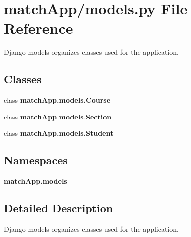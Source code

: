 \section{match\+App/models.py File Reference}
\label{models_8py}


Django models organizes classes used for the application.  


\subsection*{Classes}
\begin{DoxyCompactItemize}
\item 
class {\bf match\+App.\+models.\+Course}
\item 
class {\bf match\+App.\+models.\+Section}
\item 
class {\bf match\+App.\+models.\+Student}
\end{DoxyCompactItemize}
\subsection*{Namespaces}
\begin{DoxyCompactItemize}
\item 
 {\bf match\+App.\+models}
\end{DoxyCompactItemize}


\subsection{Detailed Description}
Django models organizes classes used for the application. 

